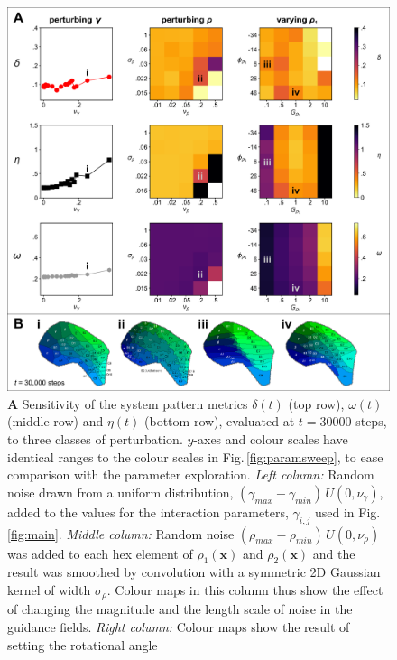 \documentclass[9pt,lineno]{elife}
\newcommand{\MPthreeSens}[1]{\textcolor{colmpthreesens}{#1}}
\newcommand{\mb}[1]{\mathbf{#1}}
\begin{document}
\begin{figure}
  \begin{fullwidth}
    \includegraphics[width=\linewidth]{./Fig3.png}
    \caption{
      \MPthreeSens{\textbf{A} Sensitivity of the system pattern
        metrics $\delta(t)$ (top row), $\omega(t)$ (middle row) and $\eta(t)$
        (bottom row), evaluated at $t=30000$ steps,
        to three classes of perturbation. $y$-axes and colour scales have identical ranges
        to the colour scales in Fig.\,\ref{fig:paramsweep}, to ease comparison
        with the parameter exploration.
        \emph{Left column:} Random noise drawn from a uniform distribution,
        $(\gamma_{max}-\gamma_{min})\,U(0,\nu_\gamma)$, added
        to the values for the interaction parameters, $\gamma_{i,j}$ used in
        Fig.\,\ref{fig:main}.
        \emph{Middle column:} Random noise $(\rho_{max} - \rho_{min})\,U(0, \nu_{\rho})$
        was added to each hex element of $\rho_1(\mb{x})$ and $\rho_2(\mb{x})$ and the result
        was smoothed by convolution with a symmetric 2D
        Gaussian kernel of width $\sigma_\rho$. Colour maps in this column
        thus show the effect of changing the magnitude and the length scale of
        noise in the guidance fields.
        \emph{Right column:} Colour maps show the result of setting the rotational angle
}}
\end{fullwidth}
\end{figure}
\end{document}
